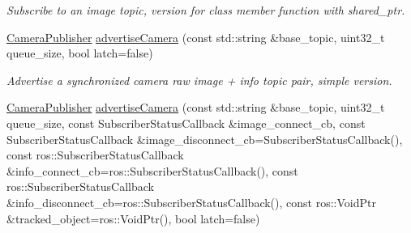 \begin{DoxyCompactItemize}
\begin{DoxyCompactList}\small\item\em Subscribe to an image topic, version for class member function with shared\-\_\-ptr. \end{DoxyCompactList}\item 
\hypertarget{classimage__transport_1_1_image_transport_ad3b41e47e56b23379043941b2a5ab297}{\hyperlink{classimage__transport_1_1_camera_publisher}{Camera\-Publisher} \hyperlink{classimage__transport_1_1_image_transport_ad3b41e47e56b23379043941b2a5ab297}{advertise\-Camera} (const std\-::string \&base\-\_\-topic, uint32\-\_\-t queue\-\_\-size, bool latch=false)}\label{classimage__transport_1_1_image_transport_ad3b41e47e56b23379043941b2a5ab297}

\begin{DoxyCompactList}\small\item\em Advertise a synchronized camera raw image + info topic pair, simple version. \end{DoxyCompactList}\item 
\hypertarget{classimage__transport_1_1_image_transport_ab66084afe1acc3e3f7b91bdfe7e125ea}{\hyperlink{classimage__transport_1_1_camera_publisher}{Camera\-Publisher} \hyperlink{classimage__transport_1_1_image_transport_ab66084afe1acc3e3f7b91bdfe7e125ea}{advertise\-Camera} (const std\-::string \&base\-\_\-topic, uint32\-\_\-t queue\-\_\-size, const Subscriber\-Status\-Callback \&image\-\_\-connect\-\_\-cb, const Subscriber\-Status\-Callback \&image\-\_\-disconnect\-\_\-cb=Subscriber\-Status\-Callback(), const ros\-::\-Subscriber\-Status\-Callback \&info\-\_\-connect\-\_\-cb=ros\-::\-Subscriber\-Status\-Callback(), const ros\-::\-Subscriber\-Status\-Callback \&info\-\_\-disconnect\-\_\-cb=ros\-::\-Subscriber\-Status\-Callback(), const ros\-::\-Void\-Ptr \&tracked\-\_\-object=ros\-::\-Void\-Ptr(), bool latch=false)}\label{classimage__transport_1_1_image_transport_ab66084afe1acc3e3f7b91bdfe7e125ea}


\end{DoxyCompactItemize}
